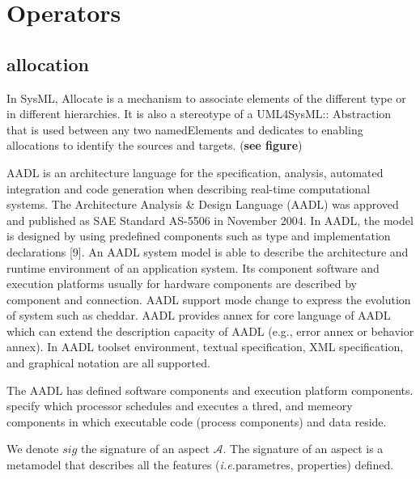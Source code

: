 \section{Operators}

\subsection{allocation}
In SysML, Allocate is a mechanism to associate elements of the different type or in different hierarchies. It is also a stereotype of a UML4SysML:: Abstraction that is used between any two namedElements and dedicates to enabling allocations to identify the sources and targets. (\textbf{see figure}) 

AADL is an architecture language for the specification, analysis, automated integration and code generation when describing real-time computational systems. The Architecture Analysis \& Design Language (AADL) was approved and published as SAE Standard AS-5506 in November 2004. In AADL, the model is designed by using predefined components such as type and implementation declarations  [9]. An AADL system model is able to describe the architecture and runtime environment of an application system. Its component software and execution platforms usually for hardware components are described by component and connection. AADL support mode change to express the evolution of system such as cheddar. AADL provides annex for core language of AADL which can extend the description capacity of AADL (e.g., error annex or behavior annex). In AADL toolset environment, textual specification, XML specification, and graphical notation are all supported.

The AADL has defined software components and execution platform components. specify which processor schedules and executes a thred, and memeory components in which executable code (process components) and data reside.








We denote $sig$ the signature of an aspect $\mathcal{A}$. The signature of an aspect is a metamodel that describes all the features (\textit{i.e.}parametres, properties) defined.